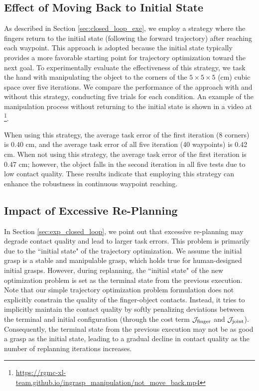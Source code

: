 {\subsection{Effect of Moving Back to Initial State}

As described in Section \ref{sec:closed_loop_exe}, we employ a strategy where the fingers return to the initial state (following the forward trajectory) after reaching each waypoint. This approach is adopted because the initial state typically provides a more favorable starting point for trajectory optimization toward the next goal.
To experimentally evaluate the effectiveness of this strategy, we task the hand with manipulating the object to the corners of the $5 \times 5 \times 5$ (cm) cubic space over five iterations. We compare the performance of the approach with and without this strategy, conducting five trials for each condition. 
An example of the manipulation process without returning to the initial state is shown in a video at \href{https://rgmc-xl-team.github.io/ingrasp_manipulation/not_move_back.mp4}{}\footnote{
\href{https://rgmc-xl-team.github.io/ingrasp_manipulation/not_move_back.mp4}{https://rgmc-xl-team.github.io/ingrasp\_manipulation/not\_move\_back.mp4}}.

When using this strategy, the average task error of the first iteration (8 corners) is 0.40 cm, and the average task error of all five iteration (40 waypoints) is 0.42 cm. 
When not using this strategy, the average task error of the first iteration is 0.47 cm; however, the object falls in the second iteration in all five tests due to low contact quality. These results indicate that employing this strategy can enhance the robustness in continuous waypoint reaching.

\subsection{Impact of Excessive Re-Planning}

In Section \ref{sec:exp_closed_loop}, we point out that excessive re-planning may degrade contact quality and lead to larger task errors. 
This problem is primarily due to the ``initial state" of the trajectory optimization.
We assume the initial grasp is a stable and manipulable grasp, which holds true for human-designed initial grasps. 
However, during replanning, the ``initial state" of the new optimization problem is set as the terminal state from the previous execution. 
Note that our simple trajectory optimization problem formulation does not explicitly constrain the quality of the finger-object contacts. Instead, it tries to implicitly maintain the contact quality by softly penalizing deviations between the terminal and initial configuration (through the cost term $\mathcal{J}_{\rm finger}$ and $\mathcal{J}_{\rm joint}$).
Consequently, the terminal state from the previous execution may not be as good a grasp as the initial state, leading to a gradual decline in contact quality as the number of replanning iterations increases. 

}
